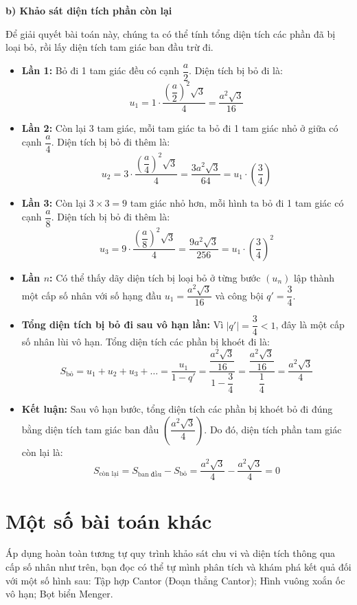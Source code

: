 \documentclass[12pt,a4paper,oneside]{book}
\theoremstyle{theorem}
\theoremstyle{definition}
\begin{document}
    \noindent \textbf{b) Khảo sát diện tích phần còn lại}

    Để giải quyết bài toán này, chúng ta có thể tính tổng diện tích các phần đã bị loại bỏ, rồi lấy diện tích tam giác ban đầu trừ đi.

    \begin{itemize}
    \item \textbf{Lần 1:} Bỏ đi 1 tam giác đều có cạnh $\dfrac{a}{2}$. Diện tích bị bỏ đi là:
    \[
    u_1 = 1 \cdot \dfrac{\left(\dfrac{a}{2}\right)^2 \sqrt{3}}{4} = \dfrac{a^2\sqrt{3}}{16}
    \]

    \item \textbf{Lần 2:} Còn lại 3 tam giác, mỗi tam giác ta bỏ đi 1 tam giác nhỏ ở giữa có cạnh $\dfrac{a}{4}$. Diện tích bị bỏ đi thêm là:
    \[
    u_2 = 3 \cdot \dfrac{\left(\dfrac{a}{4}\right)^2 \sqrt{3}}{4} = \dfrac{3a^2\sqrt{3}}{64} = u_1 \cdot \left(\dfrac{3}{4}\right)
    \]

    \item \textbf{Lần 3:} Còn lại $3 \times 3 = 9$ tam giác nhỏ hơn, mỗi hình ta bỏ đi 1 tam giác có cạnh $\dfrac{a}{8}$. Diện tích bị bỏ đi thêm là:
    \[
    u_3 = 9 \cdot \dfrac{\left(\dfrac{a}{8}\right)^2 \sqrt{3}}{4} = \dfrac{9a^2\sqrt{3}}{256} = u_1 \cdot \left(\dfrac{3}{4}\right)^2
    \]

    \item \textbf{Lần $n$:} Có thể thấy dãy diện tích bị loại bỏ ở từng bước $(u_n)$ lập thành một cấp số nhân với số hạng đầu $u_1 = \dfrac{a^2\sqrt{3}}{16}$ và công bội $q' = \dfrac{3}{4}$.

    \item \textbf{Tổng diện tích bị bỏ đi sau vô hạn lần:} Vì $|q'| = \dfrac{3}{4} < 1$, đây là một cấp số nhân lùi vô hạn. Tổng diện tích các phần bị khoét đi là:
    \[
    S_{\text{bỏ}} = u_1 + u_2 + u_3 + \dots = \dfrac{u_1}{1 - q'} = \dfrac{\dfrac{a^2\sqrt{3}}{16}}{1 - \dfrac{3}{4}} = \dfrac{\dfrac{a^2\sqrt{3}}{16}}{\dfrac{1}{4}} = \dfrac{a^2\sqrt{3}}{4}
    \]

    \item \textbf{Kết luận:} Sau vô hạn bước, tổng diện tích các phần bị khoét bỏ đi đúng bằng diện tích tam giác ban đầu $\left(\dfrac{a^2\sqrt{3}}{4}\right)$. Do đó, diện tích phần tam giác còn lại là:
    \[
    S_{\text{còn lại}} = S_{\text{ban đầu}} - S_{\text{bỏ}} = \dfrac{a^2\sqrt{3}}{4} - \dfrac{a^2\sqrt{3}}{4} = 0
    \]
    \end{itemize}
    \section{Một số bài toán khác}
    Áp dụng hoàn toàn tương tự quy trình khảo sát chu vi và diện tích thông qua cấp số nhân như trên, bạn đọc có thể tự mình phân tích và khám phá kết quả đối với một số hình sau: Tập hợp Cantor (Đoạn thẳng Cantor); Hình vuông xoắn ốc vô hạn; Bọt biển Menger.
\end{document}
